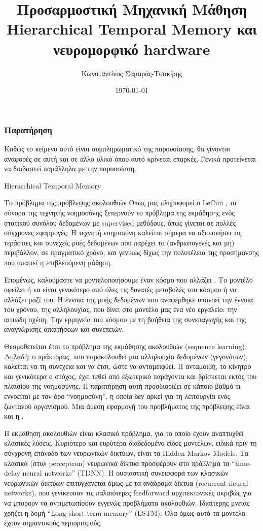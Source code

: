 \documentclass[a4paper,11pt]{article}
\title{Προσαρμοστική Μηχανική Μάθηση \linebreak Hierarchical Temporal Memory και νευρομορφικό hardware}
\author{Κωνσταντίνος Σαμαράς-Τσακίρης}
\date{\today}
\renewcommand{\emph}[1]{\textcolor{blue}{\oldemph{#1}}}
\begin{document}
\maketitle

\subsubsection*{Παρατήρηση}
Καθώς το κείμενο αυτό είναι συμπληρωματικό της παρουσίασης, θα γίνονται αναφορές σε αυτή και σε άλλο υλικό όπου αυτό κρίνεται επαρκές. Γενικά προτείνεται να διαβαστεί παράλληλα με την παρουσίαση.

\begin{section}{Hierarchical Temporal Memory}
  \begin{subsection}{Το πρόβλημα της πρόβλεψης ακολουθιών}
	Όπως μας πληροφορεί ο LeCun \cite{lecun}, τα σύνορα της τεχνητής νοημοσύνης ξεπερνούν το πρόβλημα της εκμάθησης ενός στατικού συνόλου δεδομένων με supervised μεθόδους, όπως γίνεται σε πολλές σύγχρονες εφαρμογές. Η τεχνητή νοημοσύνη καλείται σήμερα να αξιοποιήσει τις τεράστιες και συνεχείς ροές δεδομένων που παρέχει το (ανθρωπογενές και μη) περιβάλλον, σε πραγματικό χρόνο, και γενικώς δίχως την πολυτέλεια της προσήμανσης που απαιτεί η επιβλεπόμενη μάθηση.

	Επομένως, καλούμαστε να μοντελοποιήσουμε έναν κόσμο που αλλάζει \cite{staticbottleneck}. Το μοντέλο οφείλει ή να είναι γενικότερο από όλες τις δυνατές μεταβολές του κόσμου ή να αλλάζει μαζί του. Η έννοια της ροής δεδομένων που αναφέρθηκε υπονοεί την έννοια του χρόνου, της αλληλουχίας, που δίνει στο μοντέλο μας ένα νέο εργαλείο: την αιτιώδη σχέση. Την ερμηνεία του κόσμου με τη βοήθεια της συνεπαγωγής και της αναγνώρισης απαιτήσεων και συνεπειών.

	Θεσμοθετείται έτσι το πρόβλημα της εκμάθησης ακολουθιών (sequence learning). Δηλαδή: ο πράκτορας, που παρακολουθεί μια αλληλουχία δεδομένων (γεγονότων), καλείται να \emph{προβλέψει} τη συνέχεια και να \emph{δράσει} έτσι, ώστε να ανταμειφθεί. Η ανταμοιβή, το κίνητρο και γενικότερα ο στόχος, έχει τεθεί από εξωτερικό παράγοντα και βρίσκεται εκτός του πλαισίου της νοημοσύνης. Η παρατήρηση αυτή προσδιορίζει σε κάποιο βαθμό τι εννοείται με τον όρο ``νοημοσύνη'', η οποία δεν αρκεί για τη λειτουργία ενός ζωντανού οργανισμού. Μια άμεση εφαρμογή του προβλήματος της πρόβλεψης είναι και η \emph{αναγνώριση ανωμαλιών}.

	Η εκμάθηση ακολουθιών είναι κλασικό πρόβλημα, για το οποίο έχουν αναπτυχθεί κλασικές λύσεις. Κυριότερο και ευρύτερα διαδεδομένο είδος μοντέλων, ειδικά πριν τη σύγχρονη επάνοδο των νευρωνικών δικτύων, είναι τα Hidden Markov Models. Τα κλασικά (στυλ perceptron) νευρωνικά δίκτυα προσφέρουν στο πρόβλημα τα ``time-delay neural networks'' (TDNN). Η ουσιαστική συνεισφορά των κλασικών νευρωνικών δικτύων επιτυγχάνεται όμως με τα ανάδρομα δίκτυα (recurrent neural networks), που γενίκευσαν τις παλαιότερες feedforward αρχιτεκτονικές ακριβώς για να μπορούν να αντιμετωπίσουν εγγενώς προβλήματα ακολουθιών. Ιδιαίτερης μνείας χρήζει η δομή ``Long short-term memory'' (LSTM). Όλα όμως αυτά τα μοντέλα έχουν σημαντικούς περιορισμούς.


\end{subsection}
\end{section}
\end{document}
